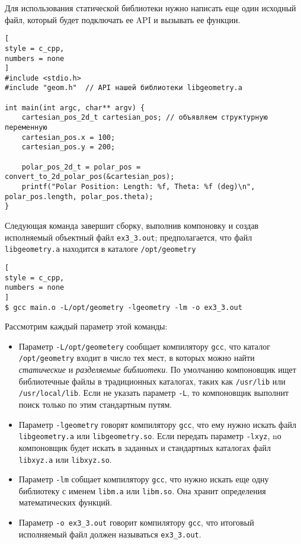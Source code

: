 \documentclass[%
	11pt,
	a4paper,
	utf8,
		]{article}
\begin{document}
Для использования статической библиотеки нужно написать еще один исходный файл, который будет подключать ее API и вызывать ее функции.
\begin{lstlisting}[
style = c_cpp,
numbers = none
]
#include <stdio.h>
#include "geom.h"  // API нашей библиотеки libgeometry.a

int main(int argc, char** argv) {
    cartesian_pos_2d_t cartesian_pos; // объявляем структурную переменную
    cartesian_pos.x = 100;
    cartesian_pos.y = 200;
    
    polar_pos_2d_t = polar_pos = convert_to_2d_polar_pos(&cartesian_pos);
    printf("Polar Position: Length: %f, Theta: %f (deg)\n", polar_pos.length, polar_pos.theta);
}
\end{lstlisting}

Следующая команда завершит сборку, выполнив компоновку и создав исполняемый объектный файл \verb|ex3_3.out|; предполагается, что файл \verb|libgeometry.a| находится в каталоге \verb|/opt/geometry|
\begin{lstlisting}[
style = c_cpp,
numbers = none
]
$ gcc main.o -L/opt/geometry -lgeometry -lm -o ex3_3.out
\end{lstlisting}

Рассмотрим каждый параметр этой команды:
\begin{itemize}
	\item Параметр \verb|-L/opt/geometery| сообщает компилятору \verb|gcc|, что каталог \verb|/opt/geometry| входит в число тех мест, в которых можно найти \emph{статические} и \emph{разделяемые библиотеки}. По умолчанию компоновщик ищет библиотечные файлы в традиционных каталогах, таких как \verb|/usr/lib| или \verb|/usr/local/lib|. Если не указать параметр \verb|-L|, то компоновщик выполнит поиск только по этим стандартным путям.
	
	\item Параметр \verb|-lgeometry| говорят компилятору \verb|gcc|, что ему нужно искать файл \verb|libgeometry.a| или \verb|libgeometry.so|. Если передать параметр \verb|-lxyz|, nо компоновщик будет искать в заданных и стандартных каталогах файл \verb|libxyz.a| или \verb|libxyz.so|. 
	
	\item Параметр \verb|-lm| собщает компилятору \verb|gcc|, что нужно искать еще одну библиотеку с именем \verb|libm.a| или \verb|libm.so|. Она хранит определения математических функций.
	
	\item Параметр \verb|-o ex3_3.out| говорит компилятору \verb|gcc|, что итоговый исполняемый файл должен называться \verb|ex3_3.out|.
\end{itemize}
\end{document}
